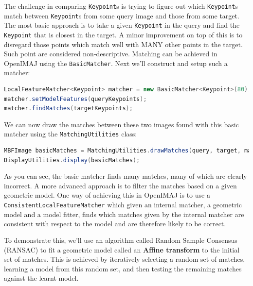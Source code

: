 \documentclass[10pt,a4paper,twoside,extrafontsizes]{memoir}
\begin{document}
The challenge in comparing \verb+Keypoint+s is trying to figure out which \verb+Keypoint+s match 
between \verb+Keypoint+s from some query image and those from some target. The most basic approach 
is to take a given \verb+Keypoint+ in the query and find the \verb+Keypoint+ that is closest in the 
target. A minor improvement on top of this is to disregard those points which match well with MANY
other points in the target. Such point are considered non-descriptive. Matching can be achieved in 
OpenIMAJ using the \verb+BasicMatcher+. Next we'll construct and setup such a matcher:
\begin{lstlisting}[language=java]
LocalFeatureMatcher<Keypoint> matcher = new BasicMatcher<Keypoint>(80);
matcher.setModelFeatures(queryKeypoints);
matcher.findMatches(targetKeypoints);
\end{lstlisting}
We can now draw the matches between these two images found with this basic matcher using the 
\verb+MatchingUtilities+ class:
\begin{lstlisting}[language=java]
MBFImage basicMatches = MatchingUtilities.drawMatches(query, target, matcher.getMatches(), RGBColour.RED);
DisplayUtilities.display(basicMatches);
\end{lstlisting}
As you can see, the basic matcher finds many matches, many of which are clearly incorrect. A more advanced 
approach is to filter the matches based on a given geometric model. One way of achieving this in OpenIMAJ 
is to use a \verb+ConsistentLocalFeatureMatcher+ which given an internal matcher, a geometric model and 
a model fitter, finds which matches given by the internal matcher are consistent with respect to the model
and are therefore likely to be correct.

To demonstrate this, we'll use an algorithm called Random Sample Consensus (RANSAC) to fit a geometric model
called an \textbf{Affine transform} to the initial set of matches. This is achieved by iteratively 
selecting a random set of matches, learning a model from this random set, and then testing the 
remaining matches against the learnt model. 
\end{document}
